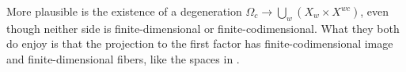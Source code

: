 \documentclass[11pt]{amsart}
\theoremstyle{definition}
\newcommand\Union\bigcup
\begin{document}
More plausible is the existence of a degeneration
$\Omega_c \to \Union_w \left( X_w \times X^{wc} \right)$, even though
neither side is finite-dimensional or finite-codimensional.  What they
both do enjoy is that the projection to the first factor has
finite-codimensional image and finite-dimensional fibers, like the
spaces in \cite{BFN1}.
 



\appendix
\end{document}

